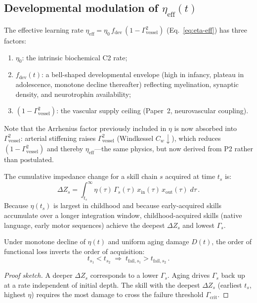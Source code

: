 \documentclass[aps,pre,twocolumn,superscriptaddress,floatfix]{revtex4-2}
\begin{document}
\subsection{Developmental modulation of $\eta_{\text{eff}}(t)$}
\label{sec:eta-lifecycle}

The effective learning rate
$\eta_{\text{eff}} = \eta_0\,f_{\text{dev}}\,
(1 - \Gamma^2_{\text{vessel}})$
(Eq.~\ref{eq:eta-eff}) has three factors:
\begin{enumerate}
  \item $\eta_0$: the intrinsic biochemical C2 rate;
  \item $f_{\text{dev}}(t)$: a bell-shaped
    developmental envelope (high in infancy, plateau
    in adolescence, monotone decline thereafter)
    reflecting myelination, synaptic density, and
    neurotrophin availability;
  \item $(1 - \Gamma^2_{\text{vessel}})$: the
    vascular supply ceiling (Paper~2,
    neurovascular coupling).
\end{enumerate}
Note that the Arrhenius factor previously included
in $\eta$ is now absorbed into
$\Gamma^2_{\text{vessel}}$: arterial stiffening raises
$\Gamma^2_{\text{vessel}}$ (Windkessel
$C_w \downarrow$), which reduces
$(1 - \Gamma^2_{\text{vessel}})$ and thereby
$\eta_{\text{eff}}$---the same physics, but now
derived from P2 rather than postulated.

The cumulative impedance change for a skill chain $s$
acquired at time $t_s$ is:
\begin{equation}
  \Delta Z_s
    = \int_{t_s}^{\infty}
      \eta(\tau)\,\Gamma_s(\tau)\,
      x_{\mathrm{in}}(\tau)\,x_{\mathrm{out}}(\tau)\;d\tau\,.
  \label{eq:skill-depth}
\end{equation}
Because $\eta(t_s)$ is largest in childhood and because
early-acquired skills accumulate over a longer integration
window, childhood-acquired skills (native language, early
motor sequences) achieve the deepest $\Delta Z_s$ and
lowest $\Gamma_s$.

\begin{proposition}
\label{prop:skill-decay}
Under monotone decline of $\eta(t)$ and uniform aging
damage $D(t)$, the order of functional loss inverts the
order of acquisition:
\[
  t_{s_1} < t_{s_2}
  \;\Longrightarrow\;
  t_{\mathrm{fail},s_1} > t_{\mathrm{fail},s_2}\,.
\]
\end{proposition}

\begin{proof}[Proof sketch]
A deeper $\Delta Z_s$ corresponds to a lower $\Gamma_s$.
Aging drives $\Gamma_s$ back up at a rate independent
of initial depth.
The skill with the deepest $\Delta Z_s$
(earliest $t_s$, highest $\eta$) requires the most damage
to cross the failure threshold $\Gamma_{\mathrm{crit}}$.
\end{proof}
\end{document}
